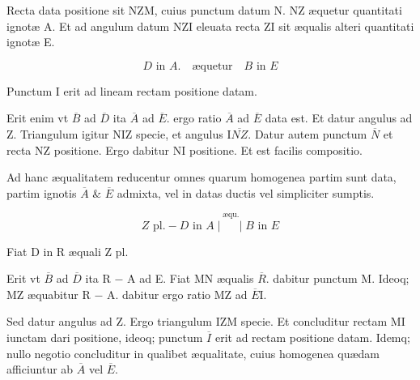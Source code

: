 \documentclass[11pt,a4paper]{article}
\begin{document}
Recta data positione sit NZM, cuius punctum datum N. NZ æquetur quantitati ignotæ A. Et ad angulum datum NZI eleuata recta ZI sit æqualis alteri quantitati ignotæ E.

\[ D \text{ in } A. \quad \text{æquetur} \quad B \text{ in } E \]

Punctum I erit ad lineam rectam positione datam.


Erit enim vt $\overline{B}$ ad $\overline{D}$ ita $\overline{A}$ ad $\overline{E}$. ergo ratio $\overline{A}$ ad $\overline{E}$ data est. Et datur angulus ad Z. Triangulum igitur NIZ specie, et angulus I$\overline{NZ}$. Datur autem punctum $\overline{N}$ et recta NZ positione. Ergo dabitur NI positione. Et est facilis compositio.

Ad hanc æqualitatem reducentur omnes quarum homogenea partim sunt data, partim ignotis $\overline{A}$ \& $\overline{E}$ admixta, vel in datas ductis vel simpliciter sumptis.

\[ Z \text{ pl.} - D \text{ in } A \;\Big|\, \overset{\text{æqu.}}{\phantom{|}} \Big|\; B \text{ in } E \]

Fiat D in R æquali Z pl.

Erit vt $\overline{B}$ ad $\overline{D}$ ita R $-$ A ad E. Fiat MN æqualis $\overline{R}$. dabitur punctum M. Ideoq; MZ æquabitur R $-$ A. dabitur ergo ratio MZ ad $\overline{E}$I.

Sed datur angulus ad Z. Ergo triangulum IZM specie. Et concluditur rectam MI iunctam dari positione, ideoq; punctum $\overline{I}$ erit ad rectam positione datam. Idemq; nullo negotio concluditur in qualibet æqualitate, cuius homogenea quædam afficiuntur ab $\overline{A}$ vel $\overline{E}$.
\end{document}
